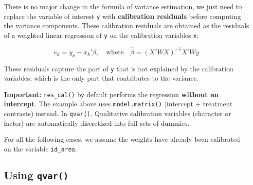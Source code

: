 \documentclass[
]{article}
\newenvironment{Shaded}{\begin{snugshade}}{\end{snugshade}}
\newcommand{\AttributeTok}[1]{\textcolor[rgb]{0.13,0.29,0.53}{#1}}
\newcommand{\CommentTok}[1]{\textcolor[rgb]{0.56,0.35,0.01}{\textit{#1}}}
\newcommand{\DecValTok}[1]{\textcolor[rgb]{0.00,0.00,0.81}{#1}}
\newcommand{\FunctionTok}[1]{\textcolor[rgb]{0.13,0.29,0.53}{\textbf{#1}}}
\newcommand{\NormalTok}[1]{#1}
\newcommand{\OtherTok}[1]{\textcolor[rgb]{0.56,0.35,0.01}{#1}}
\newcommand{\SpecialCharTok}[1]{\textcolor[rgb]{0.81,0.36,0.00}{\textbf{#1}}}
\begin{document}
There is no major change in the formula of variance estimation, we just
need to replace the variable of interest \texttt{y} with
\textbf{calibration residuals} before computing the variance components.
These calibration residuals are obtained as the residuals of a weighted
linear regression of \texttt{y} on the calibration variables \texttt{x}:

\[e_k = y_k - x_k' \hat{\beta}, \quad \text{where} \quad \hat{\beta} = (X'WX)^{-1} X'Wy\]

These residuals capture the part of \texttt{y} that is not explained by
the calibration variables, which is the only part that contributes to
the variance.

\begin{Shaded}
\end{Shaded}

\textbf{Important:} \texttt{res\_cal()} by default performs the
regression \textbf{without an intercept}. The example above uses
\texttt{model.matrix()} (intercept + treatment contrasts) instead. In
\texttt{qvar()}, Qualitative calibration variables (character or factor)
are automatically discretized into full sets of dummies.

For all the following cases, we assume the weights have already been
calibrated on the variable \texttt{id\_area}.

\subsection{\texorpdfstring{Using
\texttt{qvar()}}{Using qvar()}}\label{using-qvar-2}
\end{document}
